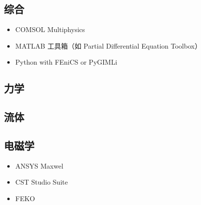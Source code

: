 
\begin{issues}
\issueDraft
\end{issues}

\subsection{综合}
\begin{itemize}
\item COMSOL Multiphysics
\item MATLAB 工具箱（如 Partial Differential Equation Toolbox）
\item Python with FEniCS or PyGIMLi
\end{itemize}


\subsection{力学}

\subsection{流体}

\subsection{电磁学}
\begin{itemize}
\item ANSYS Maxwel
\item CST Studio Suite
\item FEKO
\end{itemize}
